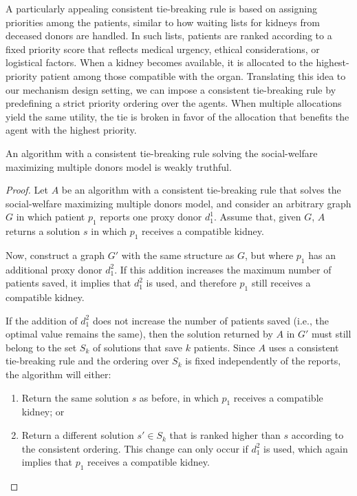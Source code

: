 A particularly appealing consistent tie-breaking rule is based on assigning priorities among the patients, similar to how waiting lists for kidneys from deceased donors are handled. In such lists, patients are ranked according to a fixed priority score that reflects medical urgency, ethical considerations, or logistical factors. When a kidney becomes available, it is allocated to the highest-priority patient among those compatible with the organ. Translating this idea to our mechanism design setting, we can impose a consistent tie-breaking rule by predefining a strict priority ordering over the agents. When multiple allocations yield the same utility, the tie is broken in favor of the allocation that benefits the agent with the highest priority.

\begin{lemma}
    An algorithm with a consistent tie-breaking rule solving the social-welfare maximizing multiple donors model is weakly truthful.
    \begin{proof}
    Let $A$ be an algorithm with a consistent tie-breaking rule that solves the social-welfare maximizing multiple donors model, and consider an arbitrary graph $G$ in which patient $p_1$ reports one proxy donor $d_1^1$. Assume that, given $G$, $A$ returns a solution $s$ in which $p_1$ receives a compatible kidney.
    
    Now, construct a graph $G'$ with the same structure as $G$, but where $p_1$ has an additional proxy donor $d_1^2$. If this addition increases the maximum number of patients saved, it implies that $d_1^2$ is used, and therefore $p_1$ still receives a compatible kidney.
    
    If the addition of $d_1^2$ does not increase the number of patients saved (i.e., the optimal value remains the same), then the solution returned by $A$ in $G'$ must still belong to the set $S_k$ of solutions that save $k$ patients. Since $A$ uses a consistent tie-breaking rule and the ordering over $S_k$ is fixed independently of the reports, the algorithm will either:
    \begin{enumerate}
        \item Return the same solution $s$ as before, in which $p_1$ receives a compatible kidney; or
        \item Return a different solution $s' \in S_k$ that is ranked higher than $s$ according to the consistent ordering. This change can only occur if $d_1^2$ is used, which again implies that $p_1$ receives a compatible kidney.
    \end{enumerate}
    \end{proof}
\end{lemma}



